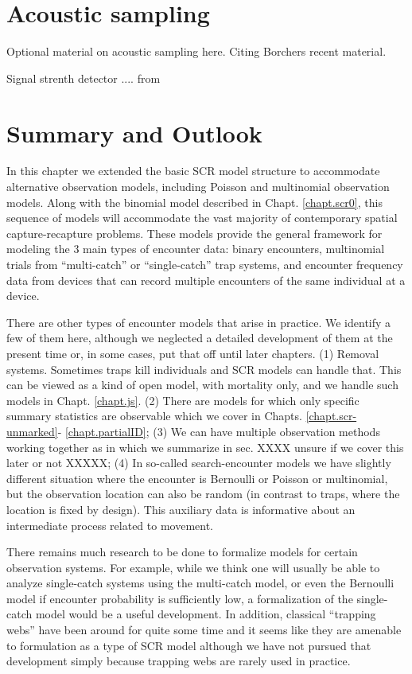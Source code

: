 \section{Acoustic sampling}

Optional material on acoustic sampling here. Citing Borchers
recent material.

Signal strenth detector .... from \citep{efford_etal:2009ecol}

\section{Summary and Outlook}

In this chapter we extended the basic SCR model structure to
accommodate alternative observation models, including Poisson and
multinomial observation models.  Along with the binomial model
described in Chapt. \ref{chapt.scr0}, this sequence of models will
accommodate the vast majority of contemporary spatial
capture-recapture problems. These models provide the general framework
for modeling the 3 main types of encounter data: binary encounters,
multinomial trials from ``multi-catch'' or ``single-catch''
\citep{efford:2004, efford:2011} trap systems, and encounter frequency
data from devices that can record multiple encounters of the same
individual at a device.

There are other types of encounter models that arise in practice. We
identify a few of them here, although we neglected a detailed
development of them at the present time or, in some cases, put that
off until later chapters.  (1) Removal systems. Sometimes traps kill
individuals and SCR models can handle that. This can be viewed as a
kind of open model, with mortality only, and we handle such models in
Chapt. \ref{chapt.js}.
(2) There are models for which only
specific summary statistics are observable \citep{chandler_royle:2012}
which we cover in Chapts. \ref{chapt.scr-unmarked}-
\ref{chapt.partialID}; (3) We can have multiple observation methods
working together as in \citet{gopalaswamy_etal:2012} which we
summarize in sec. XXXX unsure if we cover this later or not XXXXX; 
(4) In so-called search-encounter models we
have slightly different situation where the encounter is Bernoulli or
Poisson or multinomial, but the observation location can also be
random (in contrast to traps, where the location is fixed by
design). This auxiliary data is informative about an intermediate 
process related to movement.

There remains much research to be done to formalize models for certain
observation systems. For example, while we think one will usually be
able to analyze single-catch systems using the multi-catch model, or
even the Bernoulli model if encounter probability is sufficiently low, 
a formalization of the single-catch model would be a useful
development.   In addition, classical ``trapping webs''
\citep{anderson_etal:1983, wilson_anderson:1985b; jett_nichols:1987, 
parmenter_etal:1989} have 
been around for quite some time and it seems like they are amenable to
formulation as a type of SCR model although we have not pursued that development
simply because trapping webs are rarely used in practice. 

